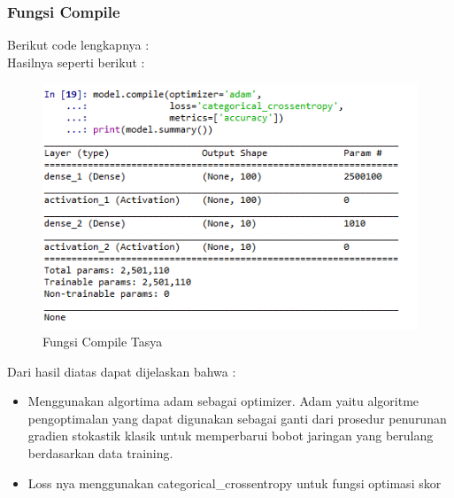 \begin{enumerate}
\begin{itemize}
\subsubsection{Fungsi Compile}
 Berikut code lengkapnya : \\

Hasilnya seperti berikut : \\
\begin{figure}[ht]
\centering
\includegraphics[scale=0.5]{figures/chapter6tasya18.png}
\caption{Fungsi Compile Tasya}
\label{Praktek}
\end{figure}
Dari hasil diatas dapat dijelaskan bahwa :\\
\begin{itemize}
\item Menggunakan algortima adam sebagai optimizer. Adam yaitu algoritme pengoptimalan yang dapat digunakan sebagai ganti dari prosedur penurunan gradien stokastik klasik untuk memperbarui bobot jaringan yang berulang berdasarkan data training.
\item Loss nya menggunakan categorical\_crossentropy untuk fungsi optimasi skor
\end{itemize}


\end{itemize}
\end{enumerate}
